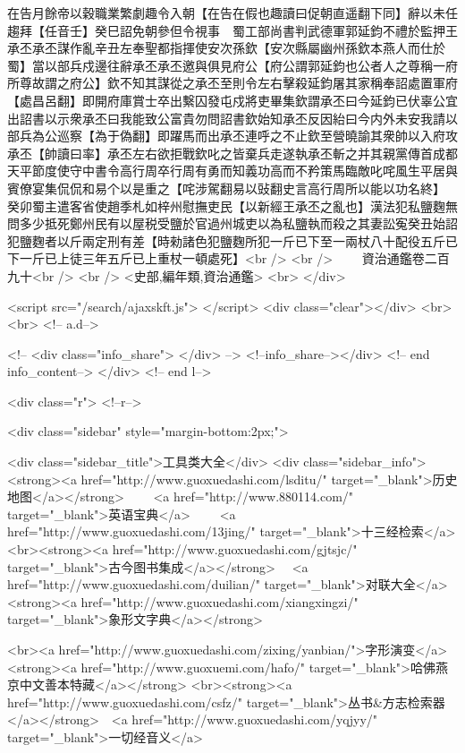 在告月餘帝以穀職業繁劇趣令入朝【在告在假也趣讀曰促朝直遥翻下同】辭以未任趨拜【任音壬】癸巳詔免朝參但令視事　蜀工部尚書判武德軍郭延鈞不禮於監押王承丕承丕謀作亂辛丑左奉聖都指揮使安次孫欽【安次縣屬幽州孫欽本燕人而仕於蜀】當以部兵戍邊往辭承丕承丕邀與俱見府公【府公謂郭延鈞也公者人之尊稱一府所尊故謂之府公】欽不知其謀從之承丕至則令左右擊殺延鈞屠其家稱奉詔處置軍府【處昌呂翻】即開府庫賞士卒出繫囚發屯戍將吏畢集欽謂承丕曰今延鈞已伏辜公宜出詔書以示衆承丕曰我能致公富貴勿問詔書欽始知承丕反因紿曰今内外未安我請以部兵為公巡察【為于偽翻】即躍馬而出承丕連呼之不止欽至營曉諭其衆帥以入府攻承丕【帥讀曰率】承丕左右欲拒戰欽叱之皆棄兵走遂執承丕斬之并其親黨傳首成都天平節度使守中書令高行周卒行周有勇而知義功高而不矜策馬臨敵叱咤風生平居與賓僚宴集侃侃和易个以是重之【咤涉駕翻易以䜴翻史言高行周所以能以功名終】　癸卯蜀主遣客省使趙季札如梓州慰撫吏民【以新經王承丕之亂也】漢法犯私鹽麴無問多少抵死鄭州民有以屋税受鹽於官過州城吏以為私鹽執而殺之其妻訟寃癸丑始詔犯鹽麴者以斤兩定刑有差【時勑諸色犯鹽麴所犯一斤已下至一兩杖八十配役五斤已下一斤已上徒三年五斤已上重杖一頓處死】<br />
<br />
　　資治通鑑卷二百九十<br />
<br />
<史部,編年類,資治通鑑>  <br>
   </div> 

<script src="/search/ajaxskft.js"> </script>
 <div class="clear"></div>
<br>
<br>
 <!-- a.d-->

 <!--
<div class="info_share">
</div> 
-->
 <!--info_share--></div>   <!-- end info_content-->
  </div> <!-- end l-->

<div class="r">   <!--r-->



<div class="sidebar"  style="margin-bottom:2px;">

 
<div class="sidebar_title">工具类大全</div>
<div class="sidebar_info">
<strong><a href="http://www.guoxuedashi.com/lsditu/" target="_blank">历史地图</a></strong>　　
<a href="http://www.880114.com/" target="_blank">英语宝典</a>　　
<a href="http://www.guoxuedashi.com/13jing/" target="_blank">十三经检索</a>　
<br><strong><a href="http://www.guoxuedashi.com/gjtsjc/" target="_blank">古今图书集成</a></strong>　
<a href="http://www.guoxuedashi.com/duilian/" target="_blank">对联大全</a>　<strong><a href="http://www.guoxuedashi.com/xiangxingzi/" target="_blank">象形文字典</a></strong>　

<br><a href="http://www.guoxuedashi.com/zixing/yanbian/">字形演变</a>　　<strong><a href="http://www.guoxuemi.com/hafo/" target="_blank">哈佛燕京中文善本特藏</a></strong>
<br><strong><a href="http://www.guoxuedashi.com/csfz/" target="_blank">丛书&方志检索器</a></strong>　<a href="http://www.guoxuedashi.com/yqjyy/" target="_blank">一切经音义</a>　　

